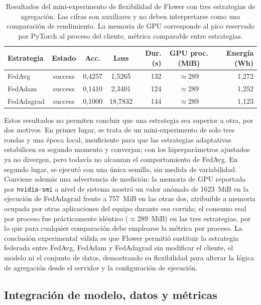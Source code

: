 \begin{table}[htbp]
  \centering
  \caption{Resultados del mini-experimento de flexibilidad de Flower con tres
  estrategias de agregación. Las cifras son auxiliares y no deben interpretarse
  como una comparación de rendimiento. La memoria de GPU corresponde al pico
  reservado por PyTorch al proceso del cliente, métrica comparable entre
  estrategias.}
  \label{tab:flex-flower-resultados}
  \begin{tabular}{lcccrcr}
    \toprule
    \textbf{Estrategia} & \textbf{Estado} & \textbf{Acc.} & \textbf{Loss} &
    \textbf{Dur. (s)} & \textbf{GPU proc. (MiB)} & \textbf{Energía (Wh)} \\
    \midrule
    FedAvg     & success & 0,4257 & 1,5265 & 132 & $\approx$289 & 1,272 \\
    FedAdam    & success & 0,1410 & 2,3401 & 124 & $\approx$289 & 1,252 \\
    FedAdagrad & success & 0,1000 & 18,7832 & 144 & $\approx$289 & 1,123 \\
    \bottomrule
  \end{tabular}
\end{table}

Estos resultados no permiten concluir que una estrategia sea superior a otra, por
dos motivos. En primer lugar, se trata de un mini-experimento de solo tres rondas
y una época local, insuficiente para que las estrategias adaptativas estabilicen
su segundo momento y converjan; con los hiperparámetros ajustados ya no divergen,
pero todavía no alcanzan el comportamiento de FedAvg. En segundo lugar, se ejecutó
con una única semilla, sin medida de variabilidad. Conviene además una
advertencia de medición: la memoria de GPU reportada por \texttt{nvidia-smi} a
nivel de sistema mostró un valor anómalo de 1623~MiB en la ejecución de
FedAdagrad frente a 757~MiB en las otras dos, atribuible a memoria ocupada por
otras aplicaciones del equipo durante esa corrida; el consumo real por proceso fue
prácticamente idéntico ($\approx$289~MiB) en las tres estrategias, por lo que para
cualquier comparación debe emplearse la métrica por proceso. La conclusión
experimental válida es que Flower permitió sustituir la estrategia federada entre
FedAvg, FedAdam y FedAdagrad sin modificar el cliente, el modelo ni el conjunto de
datos, demostrando su flexibilidad para alterar la lógica de agregación desde el
servidor y la configuración de ejecución.

\subsection{Integración de modelo, datos y métricas}\label{subsec:flex-flower-integracion}

